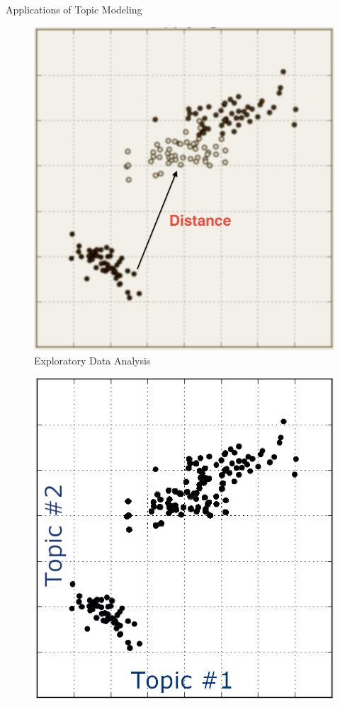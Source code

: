 \documentclass[10pt]{beamer}
\begin{document}
\begin{frame}{Applications of Topic Modeling}
\begin{multicols}{4}
  \hfill
    \begin{figure}
  \includegraphics[width=\columnwidth]{dist.png}
  \caption{Exploratory Data Analysis}
  \end{figure}
    \columnbreak

  \hfill
    \begin{figure}
  \includegraphics[width=\columnwidth]{topicanalysis.png}


\end{figure}
\end{multicols}
\end{frame}
\end{document}
